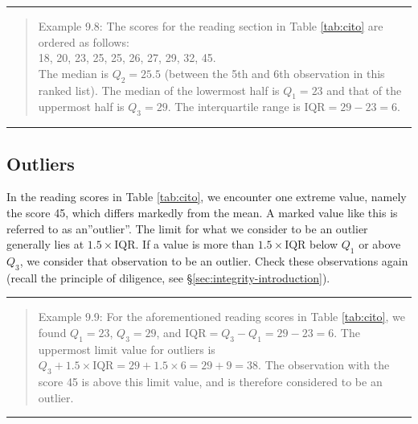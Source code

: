 \documentclass[
]{book}
\begin{document}
\begin{center}\rule{0.5\linewidth}{0.5pt}\end{center}

\begin{quote}
Example 9.8:
The scores for the reading section in
Table \ref{tab:cito} are
ordered as follows:\\
18, 20, 23, 25, 25, 26, 27, 29, 32, 45.\\
The median is \(Q_2=25.5\) (between the 5th and 6th observation in this
ranked list). The median of the lowermost half is \(Q_1=23\) and that of the
uppermost half is \(Q_3=29\). The interquartile range is
\(\textrm{IQR}=29-23=6\).
\end{quote}

\begin{center}\rule{0.5\linewidth}{0.5pt}\end{center}

\hypertarget{sec:outliers}{%
\subsection{Outliers}\label{sec:outliers}}

In the reading scores in Table \ref{tab:cito}, we encounter one extreme value, namely the score 45, which differs markedly from the mean. A marked value like this is referred to as an''outlier''. The limit for what we consider to be an outlier
generally lies at \(1.5 \times \textrm{IQR}\). If a value is more than
\(1.5 \times \textrm{IQR}\) below \(Q_1\) or above \(Q_3\), we consider that
observation to be an outlier. Check these observations again (recall the principle of diligence, see §\ref{sec:integrity-introduction}).

\begin{center}\rule{0.5\linewidth}{0.5pt}\end{center}

\begin{quote}
Example 9.9:
For the aforementioned reading scores in
Table \ref{tab:cito}, we found
\(Q_1=23\), \(Q_3=29\), and \(\textrm{IQR}=Q_3-Q_1=29-23=6\). The uppermost
limit value for outliers is
\(Q_3 + 1.5 \times \textrm{IQR} = 29 + 1.5 \times 6 = 29+9 = 38\). The
observation with the score 45 is above this limit value, and is therefore
considered to be an outlier.
\end{quote}

\begin{center}\rule{0.5\linewidth}{0.5pt}\end{center}
\end{document}
